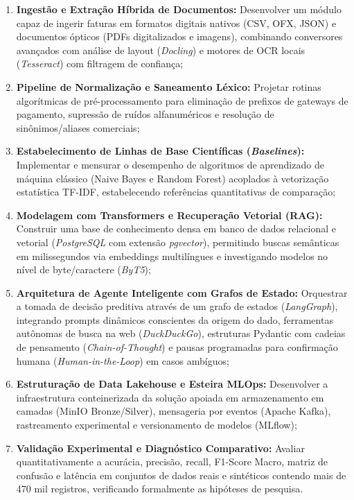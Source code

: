 \documentclass[
	12pt,				
	openright,			
	oneside,			
	a4paper,			
	english,			
	brazil				
	]{abntex2}
\begin{document}
\begin{enumerate}
    \item \textbf{Ingestão e Extração Híbrida de Documentos:} Desenvolver um módulo capaz de ingerir faturas em formatos digitais nativos (CSV, OFX, JSON) e documentos ópticos (PDFs digitalizados e imagens), combinando conversores avançados com análise de layout (\textit{Docling}) e motores de OCR locais (\textit{Tesseract}) com filtragem de confiança;
    \item \textbf{Pipeline de Normalização e Saneamento Léxico:} Projetar rotinas algorítmicas de pré-processamento para eliminação de prefixos de gateways de pagamento, supressão de ruídos alfanuméricos e resolução de sinônimos/aliases comerciais;
    \item \textbf{Estabelecimento de Linhas de Base Científicas (\textit{Baselines}):} Implementar e mensurar o desempenho de algoritmos de aprendizado de máquina clássico (Naive Bayes e Random Forest) acoplados à vetorização estatística TF-IDF, estabelecendo referências quantitativas de comparação;
    \item \textbf{Modelagem com Transformers e Recuperação Vetorial (RAG):} Construir uma base de conhecimento densa em banco de dados relacional e vetorial (\textit{PostgreSQL} com extensão \textit{pgvector}), permitindo buscas semânticas em milissegundos via embeddings multilíngues e investigando modelos no nível de byte/caractere (\textit{ByT5});
    \item \textbf{Arquitetura de Agente Inteligente com Grafos de Estado:} Orquestrar a tomada de decisão preditiva através de um grafo de estados (\textit{LangGraph}), integrando prompts dinâmicos conscientes da origem do dado, ferramentas autônomas de busca na web (\textit{DuckDuckGo}), estruturas Pydantic com cadeias de pensamento (\textit{Chain-of-Thought}) e pausas programadas para confirmação humana (\textit{Human-in-the-Loop}) em casos ambíguos;
    \item \textbf{Estruturação de Data Lakehouse e Esteira MLOps:} Desenvolver a infraestrutura conteinerizada da solução apoiada em armazenamento em camadas (MinIO Bronze/Silver), mensageria por eventos (Apache Kafka), rastreamento experimental e versionamento de modelos (MLflow);
    \item \textbf{Validação Experimental e Diagnóstico Comparativo:} Avaliar quantitativamente a acurácia, precisão, recall, F1-Score Macro, matriz de confusão e latência em conjuntos de dados reais e sintéticos contendo mais de 470 mil registros, verificando formalmente as hipóteses de pesquisa.
\end{enumerate}
\end{document}
